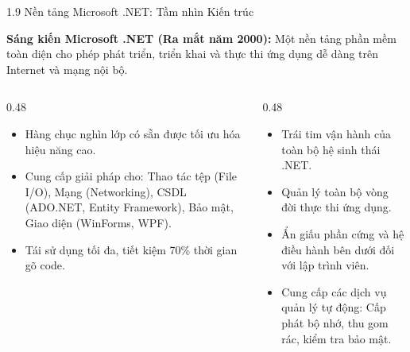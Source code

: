 \documentclass[aspectratio=169, 10pt]{beamer}
\begin{document}
\begin{frame}{1.9 Nền tảng Microsoft .NET: Tầm nhìn Kiến trúc}
  \begin{block}{\textbf{Sáng kiến Microsoft .NET (Ra mắt năm 2000):}}
    Một nền tảng phần mềm toàn diện cho phép phát triển, triển khai và thực thi ứng dụng dễ dàng trên Internet và mạng nội bộ.
  \end{block}
  \begin{columns}[T]
    \begin{column}{0.48\textwidth}
      \begin{tcolorbox}[colback=UniLightBlue,colframe=UniBlue,title=\textbf{1. Thư viện Lớp (.NET FCL)}]
        \begin{itemize}\scriptsize
          \item Hàng chục nghìn lớp có sẵn được tối ưu hóa hiệu năng cao.
          \item Cung cấp giải pháp cho: Thao tác tệp (File I/O), Mạng (Networking), CSDL (ADO.NET, Entity Framework), Bảo mật, Giao diện (WinForms, WPF).
          \item Tái sử dụng tối đa, tiết kiệm 70\% thời gian gõ code.
        \end{itemize}
      \end{tcolorbox}
    \end{column}
    \begin{column}{0.48\textwidth}
      \begin{tcolorbox}[colback=CSharpPurple!10,colframe=CSharpPurple,title=\textbf{2. Máy ảo CLR (Common Language Runtime)}]
        \begin{itemize}\scriptsize
          \item Trái tim vận hành của toàn bộ hệ sinh thái .NET.
          \item Quản lý toàn bộ vòng đời thực thi ứng dụng.
          \item Ẩn giấu phần cứng và hệ điều hành bên dưới đối với lập trình viên.
          \item Cung cấp các dịch vụ quản lý tự động: Cấp phát bộ nhớ, thu gom rác, kiểm tra bảo mật.
        \end{itemize}
      \end{tcolorbox}
    \end{column}
  \end{columns}
\end{frame}
\end{document}
